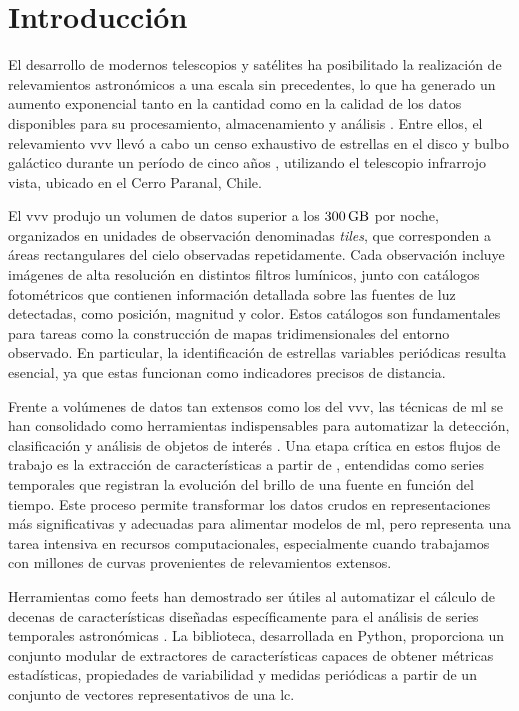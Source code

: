 \chapter{Introducción}
\label{chapter:intro}
El desarrollo de modernos telescopios y satélites ha posibilitado la realización de relevamientos astronómicos a una escala sin precedentes, lo que ha generado un aumento exponencial tanto en la cantidad como en la calidad de los datos disponibles para su procesamiento, almacenamiento y análisis \citep{cavuoti2013datarichastronomyminingsynoptic}. Entre ellos, el relevamiento \gls{vvv} llevó a cabo un censo exhaustivo de estrellas en el disco y bulbo galáctico durante un período de cinco años \citep{minniti2010vvv}, utilizando el telescopio infrarrojo \gls{vista}, ubicado en el Cerro Paranal, Chile.

El \gls{vvv} produjo un volumen de datos superior a los $\SI{300}{\giga\byte}$ por noche, organizados en unidades de observación denominadas \emph{tiles}, que corresponden a áreas rectangulares del cielo observadas repetidamente. Cada observación incluye imágenes de alta resolución en distintos filtros lumínicos, junto con catálogos fotométricos que contienen información detallada sobre las fuentes de luz detectadas, como posición, magnitud y color. Estos catálogos son fundamentales para tareas como la construcción de mapas tridimensionales del entorno observado. En particular, la identificación de estrellas variables periódicas resulta esencial, ya que estas funcionan como indicadores precisos de distancia.

Frente a volúmenes de datos tan extensos como los del \gls{vvv}, las técnicas de \gls{ml} se han consolidado como herramientas indispensables para automatizar la detección, clasificación y análisis de objetos de interés \citep{Bai_2018, Cabral_2020, Ye_2019}. Una etapa crítica en estos flujos de trabajo es la extracción de características a partir de , entendidas como series temporales que registran la evolución del brillo de una fuente en función del tiempo. Este proceso permite transformar los datos crudos en representaciones más significativas y adecuadas para alimentar modelos de \gls{ml}, pero representa una tarea intensiva en recursos computacionales, especialmente cuando trabajamos con millones de curvas provenientes de relevamientos extensos.

Herramientas como \acrfull{feets} han demostrado ser útiles al automatizar el cálculo de decenas de características diseñadas específicamente para el análisis de series temporales astronómicas \citep{cabral2018feets}. La biblioteca, desarrollada en Python, proporciona un conjunto modular de extractores de características capaces de obtener métricas estadísticas, propiedades de variabilidad y medidas periódicas a partir de un conjunto de vectores representativos de una \gls{lc}.

